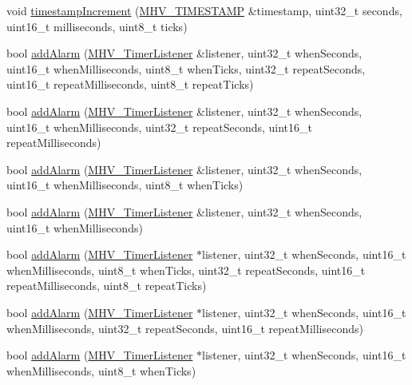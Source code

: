 \begin{DoxyCompactItemize}
\item 
void \hyperlink{class_m_h_v___r_t_c_a286a1504182064b5f8168669ac5f46c1}{timestamp\-Increment} (\hyperlink{_m_h_v___r_t_c_8h_a1e30d3a92b1b868286bd0d619245d8a6}{M\-H\-V\-\_\-\-T\-I\-M\-E\-S\-T\-A\-M\-P} \&timestamp, uint32\-\_\-t seconds, uint16\-\_\-t milliseconds, uint8\-\_\-t ticks)
\item 
bool \hyperlink{class_m_h_v___r_t_c_a282b2b154eebe88db8f5f1225246c326}{add\-Alarm} (\hyperlink{class_m_h_v___timer_listener}{M\-H\-V\-\_\-\-Timer\-Listener} \&listener, uint32\-\_\-t when\-Seconds, uint16\-\_\-t when\-Milliseconds, uint8\-\_\-t when\-Ticks, uint32\-\_\-t repeat\-Seconds, uint16\-\_\-t repeat\-Milliseconds, uint8\-\_\-t repeat\-Ticks)
\item 
bool \hyperlink{class_m_h_v___r_t_c_a97f7ec7def5d867c1d193146100e203c}{add\-Alarm} (\hyperlink{class_m_h_v___timer_listener}{M\-H\-V\-\_\-\-Timer\-Listener} \&listener, uint32\-\_\-t when\-Seconds, uint16\-\_\-t when\-Milliseconds, uint32\-\_\-t repeat\-Seconds, uint16\-\_\-t repeat\-Milliseconds)
\item 
bool \hyperlink{class_m_h_v___r_t_c_a041fd4bd05c84350eedb8f60d9c8efdd}{add\-Alarm} (\hyperlink{class_m_h_v___timer_listener}{M\-H\-V\-\_\-\-Timer\-Listener} \&listener, uint32\-\_\-t when\-Seconds, uint16\-\_\-t when\-Milliseconds, uint8\-\_\-t when\-Ticks)
\item 
bool \hyperlink{class_m_h_v___r_t_c_a112fea9b79614666f60ee1c6930a8da6}{add\-Alarm} (\hyperlink{class_m_h_v___timer_listener}{M\-H\-V\-\_\-\-Timer\-Listener} \&listener, uint32\-\_\-t when\-Seconds, uint16\-\_\-t when\-Milliseconds)
\item 
bool \hyperlink{class_m_h_v___r_t_c_a8d39f027b7305abd0a12aea616d8577f}{add\-Alarm} (\hyperlink{class_m_h_v___timer_listener}{M\-H\-V\-\_\-\-Timer\-Listener} $\ast$listener, uint32\-\_\-t when\-Seconds, uint16\-\_\-t when\-Milliseconds, uint8\-\_\-t when\-Ticks, uint32\-\_\-t repeat\-Seconds, uint16\-\_\-t repeat\-Milliseconds, uint8\-\_\-t repeat\-Ticks)
\item 
bool \hyperlink{class_m_h_v___r_t_c_a3c2af7eb56925a7c9506e2bb1f0ed965}{add\-Alarm} (\hyperlink{class_m_h_v___timer_listener}{M\-H\-V\-\_\-\-Timer\-Listener} $\ast$listener, uint32\-\_\-t when\-Seconds, uint16\-\_\-t when\-Milliseconds, uint32\-\_\-t repeat\-Seconds, uint16\-\_\-t repeat\-Milliseconds)
\item 
bool \hyperlink{class_m_h_v___r_t_c_a75077124ea1071f263cd06e1b35b1c5c}{add\-Alarm} (\hyperlink{class_m_h_v___timer_listener}{M\-H\-V\-\_\-\-Timer\-Listener} $\ast$listener, uint32\-\_\-t when\-Seconds, uint16\-\_\-t when\-Milliseconds, uint8\-\_\-t when\-Ticks)

\end{DoxyCompactItemize}
